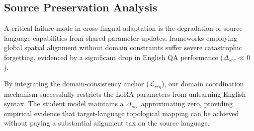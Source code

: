 \documentclass[11pt]{article}
\begin{document}
\subsection{Source Preservation Analysis}
A critical failure mode in cross-lingual adaptation is the degradation of source-language capabilities from shared parameter updates: frameworks employing global spatial alignment without domain constraints suffer severe catastrophic forgetting, evidenced by a significant drop in English QA performance ($\Delta_{src} \ll 0$). 

By integrating the domain-consistency anchor ($\mathcal{L}_{reg}$), our domain coordination mechanism successfully restricts the LoRA parameters from unlearning English syntax. The student model maintains a $\Delta_{src}$ approximating zero, providing empirical evidence that target-language topological mapping can be achieved without paying a substantial alignment tax on the source language.
\end{document}
